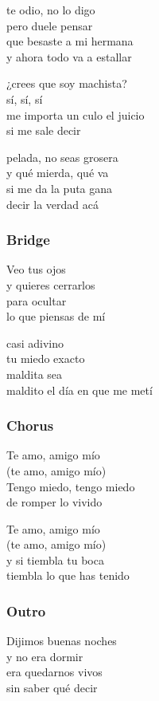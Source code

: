 te odio, no lo digo\\
pero duele pensar\\
que besaste a mi hermana\\
y ahora todo va a estallar

¿crees que soy machista?\\
sí, sí, sí\\
me importa un culo el juicio\\
si me sale decir

pelada, no seas grosera\\
y qué mierda, qué va\\
si me da la puta gana\\
decir la verdad acá

\subsubsection{Bridge}\label{bridge-15}

Veo tus ojos\\
y quieres cerrarlos\\
para ocultar\\
lo que piensas de mí

casi adivino\\
tu miedo exacto\\
maldita sea\\
maldito el día en que me metí

\subsubsection{Chorus}\label{chorus-43}

Te amo, amigo mío\\
(te amo, amigo mío)\\
Tengo miedo, tengo miedo\\
de romper lo vivido

Te amo, amigo mío\\
(te amo, amigo mío)\\
y si tiembla tu boca\\
tiembla lo que has tenido

\subsubsection{Outro}\label{outro-10}

Dijimos buenas noches\\
y no era dormir\\
era quedarnos vivos\\
sin saber qué decir

